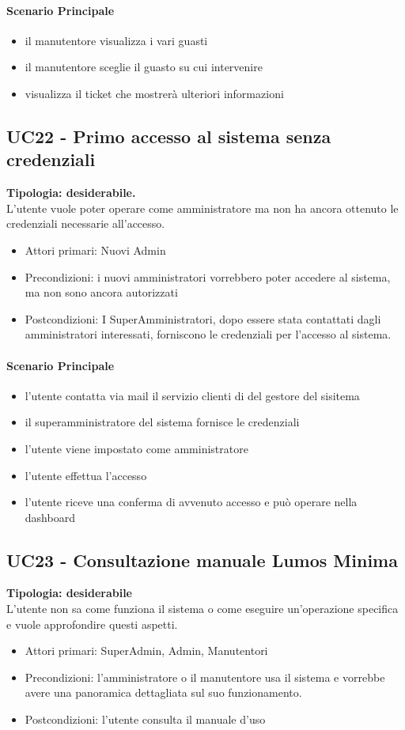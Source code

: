 \documentclass[12pt]{article}
\begin{document}
\paragraph{Scenario Principale}
\begin{itemize}
	\item il manutentore visualizza i vari guasti
	\item il manutentore sceglie il guasto su cui intervenire
	\item visualizza il ticket che mostrerà ulteriori informazioni
\end{itemize}


\subsection{UC22 - Primo accesso al sistema senza credenziali}
\textbf{Tipologia: desiderabile.} \\
L'utente vuole poter operare come amministratore ma non ha ancora ottenuto le credenziali necessarie all'accesso.
\begin{itemize}
	\item Attori primari: Nuovi Admin
	\item Precondizioni: i nuovi amministratori vorrebbero poter accedere al sistema, ma non sono ancora autorizzati
	\item Postcondizioni: I SuperAmministratori, dopo essere stata contattati dagli amministratori interessati, forniscono le credenziali per l'accesso al sistema.
\end{itemize}
\paragraph{Scenario Principale}
\begin{itemize}
	\item l'utente contatta via mail il servizio clienti di del gestore del sisitema
	\item il superamministratore del sistema fornisce le credenziali
	\item l'utente viene impostato come amministratore
	\item l'utente effettua l'accesso
	\item l'utente riceve una conferma di avvenuto accesso e può operare nella dashboard
\end{itemize}


\subsection{UC23 - Consultazione manuale Lumos Minima}
\textbf{Tipologia: desiderabile}\\
L'utente non sa come funziona il sistema o come eseguire un'operazione specifica e vuole approfondire questi aspetti.
\begin{itemize}
	\item Attori primari: SuperAdmin, Admin, Manutentori
	\item Precondizioni: l'amministratore o il manutentore usa il sistema e vorrebbe avere una panoramica dettagliata sul suo funzionamento.
	\item Postcondizioni: l'utente consulta il manuale d'uso
\end{itemize}
\end{document}
